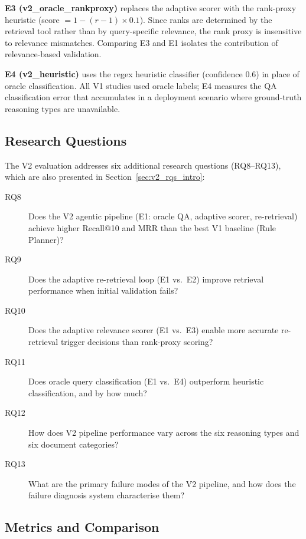 \textbf{E3 (v2\_oracle\_rankproxy)} replaces the adaptive scorer with the
rank-proxy heuristic (score $= 1 - (r-1) \times 0.1$). Since ranks are
determined by the retrieval tool rather than by query-specific relevance,
the rank proxy is insensitive to relevance mismatches. Comparing E3 and E1
isolates the contribution of relevance-based validation.

\textbf{E4 (v2\_heuristic)} uses the regex heuristic classifier (confidence
0.6) in place of oracle classification. All V1 studies used oracle labels;
E4 measures the QA classification error that accumulates in a deployment
scenario where ground-truth reasoning types are unavailable.

\subsection{Research Questions}
\label{subsec:v2_rqs}

The V2 evaluation addresses six additional research questions (RQ8--RQ13),
which are also presented in Section~\ref{sec:v2_rqs_intro}:

\begin{description}
  \item[RQ8] Does the V2 agentic pipeline (E1: oracle QA, adaptive scorer,
             re-retrieval) achieve higher Recall@10 and MRR than the best
             V1 baseline (Rule Planner)?
  \item[RQ9] Does the adaptive re-retrieval loop (E1 vs.\ E2) improve
             retrieval performance when initial validation fails?
  \item[RQ10] Does the adaptive relevance scorer (E1 vs.\ E3) enable more
              accurate re-retrieval trigger decisions than rank-proxy scoring?
  \item[RQ11] Does oracle query classification (E1 vs.\ E4) outperform
              heuristic classification, and by how much?
  \item[RQ12] How does V2 pipeline performance vary across the six reasoning
              types and six document categories?
  \item[RQ13] What are the primary failure modes of the V2 pipeline, and how
              does the failure diagnosis system characterise them?
\end{description}

\subsection{Metrics and Comparison}
\label{subsec:v2_metrics}

